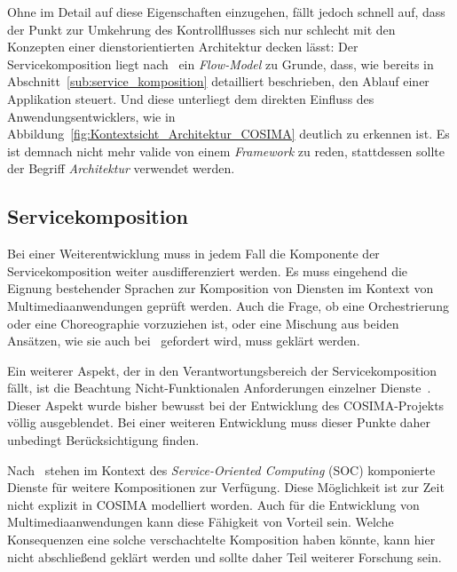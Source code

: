   Ohne im Detail auf diese Eigenschaften einzugehen, fällt jedoch schnell auf, dass der Punkt zur Umkehrung des Kontrollflusses sich nur schlecht mit den Konzepten einer dienstorientierten Architektur decken lässt: Der Servicekomposition liegt nach~\citep[S. 320]{web_services_principles_and_technology} ein \emph{Flow-Model} zu Grunde, dass, wie bereits in Abschnitt~\ref{sub:service_komposition} detailliert beschrieben, den Ablauf einer Applikation steuert. Und diese unterliegt dem direkten Einfluss des Anwendungsentwicklers, wie in Abbildung~\ref{fig:Kontextsicht_Architektur_COSIMA} deutlich zu erkennen ist. Es ist demnach nicht mehr valide von einem \emph{Framework} zu reden, stattdessen sollte der Begriff \emph{Architektur} verwendet werden.


\subsection{Servicekomposition} %
\label{sub:servicekomposition_fragen}

  Bei einer Weiterentwicklung muss in jedem Fall die Komponente der Servicekomposition weiter ausdifferenziert werden. Es muss eingehend die Eignung bestehender Sprachen zur Komposition von Diensten im Kontext von Multimediaanwendungen geprüft werden. Auch die Frage, ob eine Orchestrierung oder eine Choreographie vorzuziehen ist, oder eine Mischung aus beiden Ansätzen, wie sie auch bei~\citep{papazoglou2007soc} gefordert wird, muss geklärt werden.
  
  Ein weiterer Aspekt, der in den Verantwortungsbereich der Servicekomposition fällt, ist die Beachtung Nicht-Funktionalen Anforderungen einzelner Dienste~\citep[S. 42]{papazoglou2007soc}. Dieser Aspekt wurde bisher bewusst bei der Entwicklung des COSIMA-Projekts völlig ausgeblendet. Bei einer weiteren Entwicklung muss dieser Punkte daher unbedingt Berücksichtigung finden.

  Nach~\citep[S. 8]{service_oriented_computing} stehen im Kontext des \emph{Service-Oriented Computing} (SOC) komponierte Dienste für weitere Kompositionen zur Verfügung. Diese Möglichkeit ist zur Zeit nicht explizit in COSIMA modelliert worden. Auch für die Entwicklung von Multimediaanwendungen kann diese Fähigkeit von Vorteil sein. Welche Konsequenzen eine solche verschachtelte Komposition haben könnte, kann hier nicht abschließend geklärt werden und sollte daher Teil weiterer Forschung sein.

